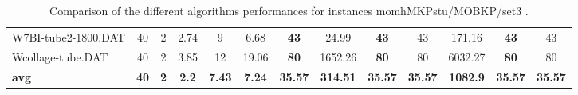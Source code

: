 \begin{table}[h]
{\begin{tabular}{lcccccccccccc}
W7BI-tube2-1800.DAT & 40 & 2 &  \textcolor{blue2}{2.74} & 9 & 6.68 &  \textbf{43} & 24.99 &  \textbf{43} & 43 & 171.16 &  \textbf{43} & 43 \\
Wcollage-tube.DAT & 40 & 2 &  \textcolor{blue2}{3.85} & 12 & 19.06 &  \textbf{80} & 1652.26 &  \textbf{80} & 80 & 6032.27 &  \textbf{80} & 80 \\
\cline{1-13} \textbf{avg} & \textbf{40} & \textbf{2} & \textbf{2.2} & \textbf{7.43} & \textbf{7.24} & \textbf{35.57} & \textbf{314.51} & \textbf{35.57} & \textbf{35.57} & \textbf{1082.9} & \textbf{35.57} & \textbf{35.57} \\ \cline{1-13}
\bottomrule
\end{tabular}
}%
\caption{Comparison of the different algorithms performances for instances momhMKPstu/MOBKP/set3 .}
\label{tab:table_compare_momhMKPstu/MOBKP/set3 }
\end{table}
